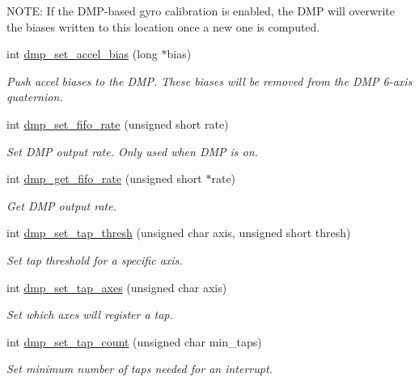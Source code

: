 \begin{DoxyCompactItemize}
\begin{DoxyCompactList}
 N\+O\+TE\+: If the D\+M\+P-\/based gyro calibration is enabled, the D\+MP will overwrite the biases written to this location once a new one is computed. \end{DoxyCompactList}\item 
int \hyperlink{group___d_r_i_v_e_r_s_gafbd714aee6086836f70aaea847771669}{dmp\+\_\+set\+\_\+accel\+\_\+bias} (long $\ast$bias)
\begin{DoxyCompactList}\small\item\em Push accel biases to the D\+MP. These biases will be removed from the D\+MP 6-\/axis quaternion. \end{DoxyCompactList}\item 
int \hyperlink{group___d_r_i_v_e_r_s_ga5399728fd572a7694af20286cc9d4121}{dmp\+\_\+set\+\_\+fifo\+\_\+rate} (unsigned short rate)
\begin{DoxyCompactList}\small\item\em Set D\+MP output rate. Only used when D\+MP is on. \end{DoxyCompactList}\item 
int \hyperlink{group___d_r_i_v_e_r_s_gaf3f9953bc04af751b1101700daffa951}{dmp\+\_\+get\+\_\+fifo\+\_\+rate} (unsigned short $\ast$rate)
\begin{DoxyCompactList}\small\item\em Get D\+MP output rate. \end{DoxyCompactList}\item 
int \hyperlink{group___d_r_i_v_e_r_s_ga15da67c0a6c94e0cdaceb8b165e13af9}{dmp\+\_\+set\+\_\+tap\+\_\+thresh} (unsigned char axis, unsigned short thresh)
\begin{DoxyCompactList}\small\item\em Set tap threshold for a specific axis. \end{DoxyCompactList}\item 
int \hyperlink{group___d_r_i_v_e_r_s_ga66bc5c8fc26fcb498df53fc62aa87e4f}{dmp\+\_\+set\+\_\+tap\+\_\+axes} (unsigned char axis)
\begin{DoxyCompactList}\small\item\em Set which axes will register a tap. \end{DoxyCompactList}\item 
int \hyperlink{group___d_r_i_v_e_r_s_ga819f947b2cb107ada7b9a94c41be0dad}{dmp\+\_\+set\+\_\+tap\+\_\+count} (unsigned char min\+\_\+taps)
\begin{DoxyCompactList}\small\item\em Set minimum number of taps needed for an interrupt. \end{DoxyCompactList}\item 

\end{DoxyCompactItemize}
